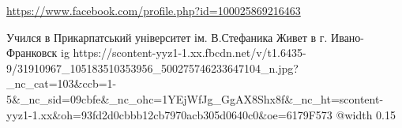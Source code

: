  
 
 
 
 

\url{https://www.facebook.com/profile.php?id=100025869216463}\par
Учился в Прикарпатський університет ім. В.Стефаника
Живет в г. Ивано-Франковск
\ifcmt
  ig https://scontent-yyz1-1.xx.fbcdn.net/v/t1.6435-9/31910967_105183510353956_500275746233647104_n.jpg?_nc_cat=103&ccb=1-5&_nc_sid=09cbfe&_nc_ohc=1YEjWfJg_GgAX8Shx8f&_nc_ht=scontent-yyz1-1.xx&oh=93fd2d0cbbb12cb7970acb305d0640c0&oe=6179F573
  @width 0.15
\fi

